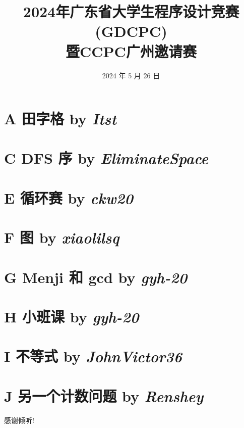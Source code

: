 \documentclass[dvipsnames]{ctexbeamer}
\title{2024年广东省大学生程序设计竞赛(GDCPC) \\ 暨CCPC广州邀请赛}
\author{}
\institute{清华大学学生算法协会}
\date{2024 年 5 月 26 日}
\begin{document}
\frame{\titlepage}


\frame[allowframebreaks]{
    \tableofcontents[sections={1-5}]
    \framebreak
    \tableofcontents[sections={6-10}]
}


\section{A 田字格 by \itshape Itst}


% 

\section{C DFS 序 by \itshape EliminateSpace}


% 

\section{E 循环赛 by \itshape ckw20}


\section{F 图 by \itshape xiaolilsq}


\section{G Menji 和 gcd by \itshape gyh-20}


\section{H 小班课 by \itshape gyh-20}


\section{I 不等式 by \itshape JohnVictor36}


\section{J 另一个计数问题 by \itshape Renshey}


\begin{frame}{}
    \begin{center}
        \Large 感谢倾听!
    \end{center}
\end{frame}
\end{document}
